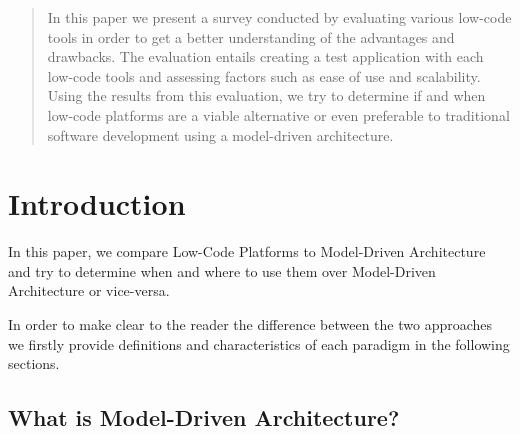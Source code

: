 \documentclass[runningheads]{llncs}
\begin{document}

\maketitle

\vspace{8em}

\begin{abstract}

In this paper we present a survey conducted by evaluating various low-code tools in order to get a better understanding of the advantages and drawbacks. The evaluation entails creating a test application with each low-code tools and assessing factors such as ease of use and scalability. Using the results from this evaluation, we try to determine if and when low-code platforms are a viable alternative or even preferable to traditional software development using a model-driven architecture.


\end{abstract}

\newpage

\section{Introduction}
\label{sec:introduction}

In this paper, we compare Low-Code Platforms to Model-Driven Architecture and try to determine when and where to use them over Model-Driven Architecture or vice-versa.

In order to make clear to the reader the difference between the two approaches we firstly provide definitions and characteristics of each paradigm in the following sections.

\subsection{What is Model-Driven Architecture?}
\label{ssec:what_is_model_driven}
\end{document}

